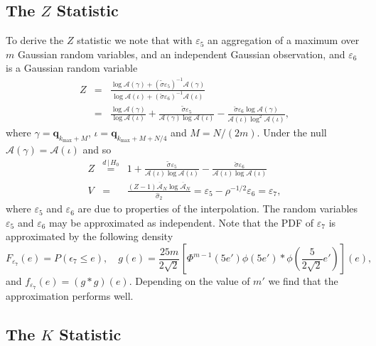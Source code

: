 \documentclass[dvips,aoas,preprint]{imsart}
\numberwithin{equation}{section}
\theoremstyle{plain}
\newcommand{\q}{\mathbf{q}}
\newcommand{\cA}{\mathcal{A}}
\newcommand{\vare}{\varepsilon}
\begin{document}
\subsection{The $Z$ Statistic}
\label{threshzeta}

To derive the $Z$ statistic we note that
with $\varepsilon_5$ an aggregation of a maximum over $m$ Gaussian
random variables, and an independent Gaussian
observation, and $\varepsilon_6$ is a Gaussian random variable
\begin{eqnarray}
  Z &=& \frac{\log\cA\left(\gamma\right) +
    (\tilde\sigma\vare_5)^{-1}\cA(\gamma)}{\log\cA(\iota) +
    (\breve\sigma\vare_6)^{-1}\cA(\iota)}\\
  &=& \frac{\log\cA(\gamma)}{\log\cA(\iota)} +
  \frac{\tilde\sigma\vare_{5}}{\cA(\gamma)\log\cA(\iota)} -
  \frac{\breve\sigma\vare_{6}\log\cA(\gamma)}{\cA(\iota)\log^2\cA(\iota)},
\end{eqnarray}
where $\gamma=\q_{k_\text{max}+M}$, $\iota=\q_{k_\text{max}+M+N/4}$
and $M=N/(2m)$.  Under the null $\cA(\gamma)=\cA(\iota)$ and so
\begin{eqnarray}
  Z &\overset{d\,|\,H_0}{=}& 1 +
    \frac{\tilde{\sigma}\vare_{5}}{\cA(\iota)\log\cA(\iota)} -
    \frac{\breve{\sigma}\vare_{6}}{\cA(\iota)\log\cA(\iota)}\\
  V &=& \frac{(Z-1)\overline{\cA}_N\log\overline{\cA}_N}{\hat\sigma_2} 
    = \vare_5 - \rho^{-1/2}\vare_6 = \vare_7,
\end{eqnarray}
where $\vare_{5}$ and $\vare_6$ are  due to
properties of the interpolation.  The random variables $\vare_5$ and
$\vare_6$ may be approximated as independent.  Note that the PDF of
$\vare_7$ is approximated by the following density
\begin{equation}
  F_{\vare_7}(e) = P(\epsilon_7\le e), \quad
  g(e) = \frac{25m}{2\sqrt{2}} \left[\Phi^{m-1}\left(5e'\right)
  \phi\left(5e'\right) \ast
  \phi\left(\frac{5}{2\sqrt{2}}e'\right)\right](e),
\end{equation}
and $f_{\vare_7}(e)=(g{\ast}g)(e)$.  Depending on the value of $m'$ we
find that the approximation performs well.  

\subsection{The $K$ Statistic}
\label{threshkappa}
\end{document}
